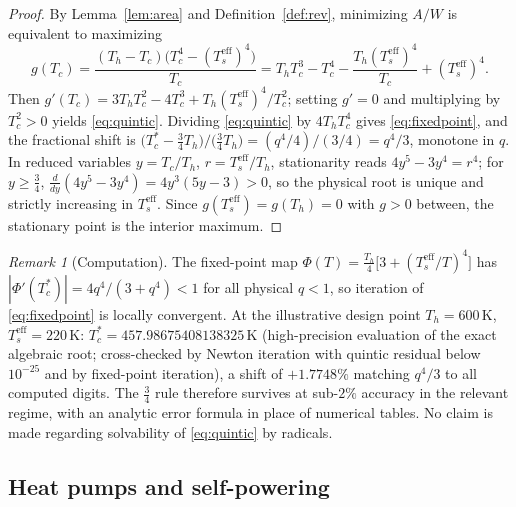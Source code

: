 \documentclass[11pt]{article}
\theoremstyle{definition}
\theoremstyle{remark}
\newtheorem{remark}{Remark}
\newcommand{\Th}{T_h}
\newcommand{\Tc}{T_c}
\newcommand{\Ts}{T_s^{\mathrm{eff}}}
\begin{document}
\begin{proof}
By Lemma~\ref{lem:area} and Definition~\ref{def:rev}, minimizing $A/W$ is equivalent to maximizing
\[
g(\Tc)=\frac{(\Th-\Tc)\bigl(\Tc^{4}-(\Ts)^{4}\bigr)}{\Tc}
=\Th \Tc^{3}-\Tc^{4}-\frac{\Th(\Ts)^{4}}{\Tc}+(\Ts)^{4}.
\]
Then $g'(\Tc)=3\Th \Tc^{2}-4\Tc^{3}+\Th(\Ts)^{4}/\Tc^{2}$; setting $g'=0$ and multiplying by $\Tc^{2}>0$ yields \eqref{eq:quintic}. Dividing \eqref{eq:quintic} by $4\Th \Tc^{4}$ gives \eqref{eq:fixedpoint}, and the fractional shift is $\bigl(\Tc^{*}-\tfrac{3}{4}\Th\bigr)/\bigl(\tfrac{3}{4}\Th\bigr)=(q^{4}/4)/(3/4)=q^{4}/3$, monotone in $q$. In reduced variables $y=\Tc/\Th$, $r=\Ts/\Th$, stationarity reads $4y^{5}-3y^{4}=r^{4}$; for $y\ge\tfrac{3}{4}$, $\frac{d}{dy}(4y^{5}-3y^{4})=4y^{3}(5y-3)>0$, so the physical root is unique and strictly increasing in $\Ts$. Since $g(\Ts)=g(\Th)=0$ with $g>0$ between, the stationary point is the interior maximum.
\end{proof}

\begin{remark}[Computation]
The fixed-point map $\Phi(T)=\tfrac{\Th}{4}\bigl[3+(\Ts/T)^{4}\bigr]$ has $|\Phi'(\Tc^{*})|=4q^{4}/(3+q^{4})<1$ for all physical $q<1$, so iteration of \eqref{eq:fixedpoint} is locally convergent. At the illustrative design point $\Th=600\,$K, $\Ts=220\,$K: $\Tc^{*}=457.98675408138325\,$K (high-precision evaluation of the exact algebraic root; cross-checked by Newton iteration with quintic residual below $10^{-25}$ and by fixed-point iteration), a shift of $+1.7748\%$ matching $q^{4}/3$ to all computed digits. The $\tfrac34$ rule therefore survives at sub-$2\%$ accuracy in the relevant regime, with an analytic error formula in place of numerical tables. No claim is made regarding solvability of \eqref{eq:quintic} by radicals.
\end{remark}

\subsection{Heat pumps and self-powering}
\end{document}
